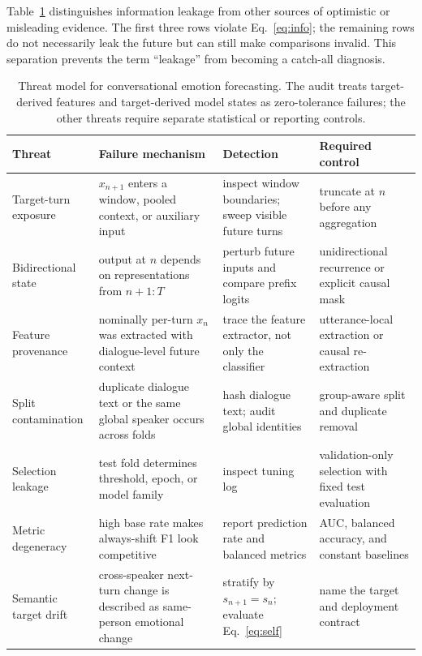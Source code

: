 \documentclass{ieeeaccess}
\begin{document}
Table~\ref{tab:threats} distinguishes information leakage from other sources of optimistic or
misleading evidence. The first three rows violate Eq.~\eqref{eq:info}; the remaining rows do not
necessarily leak the future but can still make comparisons invalid. This separation prevents the
term ``leakage'' from becoming a catch-all diagnosis.

\begin{table}[t]
\centering
\footnotesize
\caption{Threat model for conversational emotion forecasting. The audit treats target-derived
features and target-derived model states as zero-tolerance failures; the other threats require
separate statistical or reporting controls.}
\label{tab:threats}
\begin{tabular}{p{}p{}p{}p{}}
\toprule
Threat & Failure mechanism & Detection & Required control \\
\midrule
Target-turn exposure & $x_{n+1}$ enters a window, pooled context, or auxiliary input & inspect
window boundaries; sweep visible future turns & truncate at $n$ before any aggregation \\
Bidirectional state & output at $n$ depends on representations from $n+1:T$ & perturb future
inputs and compare prefix logits & unidirectional recurrence or explicit causal mask \\
Feature provenance & nominally per-turn $x_n$ was extracted with dialogue-level future context &
trace the feature extractor, not only the classifier & utterance-local extraction or causal
re-extraction \\
Split contamination & duplicate dialogue text or the same global speaker occurs across folds &
hash dialogue text; audit global identities & group-aware split and duplicate removal \\
Selection leakage & test fold determines threshold, epoch, or model family & inspect tuning log &
validation-only selection with fixed test evaluation \\
Metric degeneracy & high base rate makes always-shift F1 look competitive & report prediction
rate and balanced metrics & AUC, balanced accuracy, and constant baselines \\
Semantic target drift & cross-speaker next-turn change is described as same-person emotional change
& stratify by $s_{n+1}=s_n$; evaluate Eq.~\eqref{eq:self} & name the target and deployment contract \\
\bottomrule
\end{tabular}
\end{table}
\end{document}
